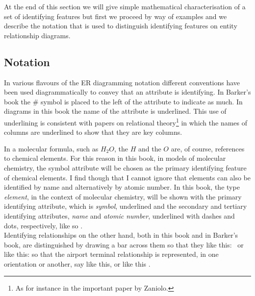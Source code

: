 At the end of this section we will give simple mathematical characterisation of a set of identifying features but first
we proceed by way of examples 
and we describe the notation that is used to distinguish identifying features on entity relationship  diagrams.

\subsection{Notation}
\mynote
In various flavours of the ER diagramming notation different conventions have been used diagrammatically to convey that an attribute is identifying. In Barker's book the \# symbol is placed to the left of the attribute to indicate as much. In diagrams in this book the name of the attribute is underlined. This use of underlining is consistent with papers on relational theory\footnote{As for instance in the important paper by Zaniolo.} in which  the names of columns are underlined to show that they are key columns.

\mynote
In a molecular formula, such as $H_2O$, the $H$ and the $O$ are, of course, references to chemical elements. For this reason in this book,
in models of molecular chemistry, the symbol attribute will be chosen as the primary identifying feature of chemical elements. I find though that I cannot ignore that elements can also be identified by name and alternatively by atomic number. 
In this book, the type \textit{element}, in the context of molecular chemistry, will be shown with the primary identifying attribute, which is \textit{symbol}, underlined and the secondary and tertiary identifying attributes, \textit{name} and \textit{atomic number}, underlined with dashes and dots, respectively, like so
\raisebox{-0.85cm}{}.\\
\vspace{0.2cm}
\mynote Identifying relationships on the other hand, both in this book and in Barker's book,
are distinguished by drawing a bar across them so that they like this: \barkerEllisJ\ or like this: \barkerEllisK so that the airport terminal relationship is represented, 
in one orientation or another, say like this,
\raisebox{-1.5cm}{} 
or like this \raisebox{-0.5cm}{}.

